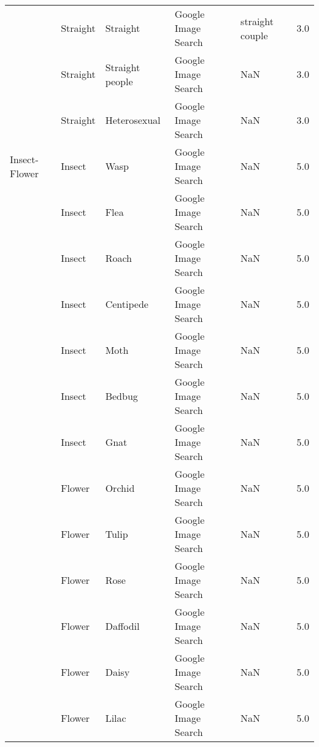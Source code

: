 \begin{tabular}{lllllr}
     & Straight &           Straight &  Google Image Search &                                    straight couple &   3.0 \\
     & Straight &    Straight people &  Google Image Search &                                                NaN &   3.0 \\
     & Straight &       Heterosexual &  Google Image Search &                                                NaN &   3.0 \\
Insect-Flower & Insect &               Wasp &  Google Image Search &                                                NaN &   5.0 \\
     & Insect &               Flea &  Google Image Search &                                                NaN &   5.0 \\
     & Insect &              Roach &  Google Image Search &                                                NaN &   5.0 \\
     & Insect &          Centipede &  Google Image Search &                                                NaN &   5.0 \\
     & Insect &               Moth &  Google Image Search &                                                NaN &   5.0 \\
     & Insect &             Bedbug &  Google Image Search &                                                NaN &   5.0 \\
     & Insect &               Gnat &  Google Image Search &                                                NaN &   5.0 \\
     & Flower &             Orchid &  Google Image Search &                                                NaN &   5.0 \\
     & Flower &              Tulip &  Google Image Search &                                                NaN &   5.0 \\
     & Flower &               Rose &  Google Image Search &                                                NaN &   5.0 \\
     & Flower &           Daffodil &  Google Image Search &                                                NaN &   5.0 \\
     & Flower &              Daisy &  Google Image Search &                                                NaN &   5.0 \\
     & Flower &              Lilac &  Google Image Search &                                                NaN &   5.0 \\

\end{tabular}
